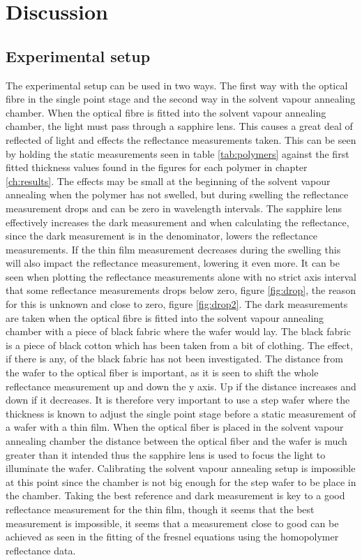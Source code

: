 \documentclass[MasterThesisMain.tex]{subfiles}
\begin{document}
\chapter{Discussion}

\section{Experimental setup}
The experimental setup can be used in two ways. The first way with the optical fibre in the single point stage and the second way in the solvent vapour annealing chamber. When the optical fibre is fitted into the solvent vapour annealing chamber, the light must pass through a sapphire lens. This causes a great deal of reflected of light and effects the reflectance measurements taken. This can be seen by holding the static measurements seen in table \ref{tab:polymers} against the first fitted thickness values found in the figures for each polymer in chapter \ref{ch:results}. The effects may be small at the beginning of the solvent vapour annealing when the polymer has not swelled, but during swelling the reflectance measurement drops and can be zero in wavelength intervals. The sapphire lens effectively increases the dark measurement and when calculating the reflectance, since the dark measurement is in the denominator, lowers the reflectance measurements. If the thin film measurement decreases during the swelling this will also impact the reflectance measurement, lowering it even more. It can be seen when plotting the reflectance measurements alone with no strict axis interval that some reflectance measurements drops below zero, figure \ref{fig:drop}, the reason for this is unknown and close to zero, figure \ref{fig:drop2}. The dark measurements are taken when the optical fibre is fitted into the solvent vapour annealing chamber with a piece of black fabric where the wafer would lay. The black fabric is a piece of black cotton which has been taken from a bit of clothing. The effect, if there is any, of the black fabric has not been investigated. The distance from the wafer to the optical fiber is important, as it is seen to shift the whole reflectance measurement up and down the y axis. Up if the distance increases and down if it decreases. It is therefore very important to use a step wafer where the thickness is known to adjust the single point stage before a static measurement of a wafer with a thin film. When the optical fiber is placed in the solvent vapour annealing chamber the distance between the optical fiber and the wafer is much greater than it intended thus the sapphire lens is used to focus the light to illuminate the wafer. Calibrating the solvent vapour annealing setup is impossible at this point since the chamber is not big enough for the step wafer to be place in the chamber. Taking the best reference and dark measurement is key to a good reflectance measurement for the thin film, though it seems that the best measurement is impossible, it seems that a measurement close to good can be achieved as seen in the fitting of the fresnel equations using the homopolymer reflectance data.
\end{document}
